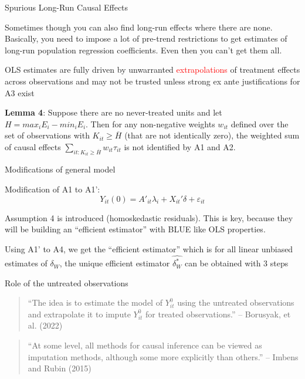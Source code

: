 \documentclass{beamer}
\begin{document}
\begin{frame}{Spurious Long-Run Causal Effects}

Sometimes though you can also find long-run effects where there are none. Basically, you need to impose a lot of pre-trend restrictions to get estimates of long-run population regression coefficients. Even then you can't get them all.  

\bigskip

OLS estimates are fully driven by unwarranted \textcolor{red}{extrapolations} of treatment effects across observations and may not be trusted unless strong ex ante justifications for A3 exist

\bigskip

\textbf{Lemma 4}: Suppose there are no never-treated units and let $H=max_i E_i - min_i E_i$. Then for any non-negative weights $w_{it}$ defined over the set of observations with $K_{it} \geq \overline{H}$ (that are not identically zero), the weighted sum of causal effects $\sum_{it:K_{it}\geq \overline{H}}w_{it} \tau_{it}$ is not identified by A1 and A2.

\end{frame}

\begin{frame}{Modifications of general model}


Modification of A1 to A1': $$ Y_{it}(0) = A'_{it} \lambda_i + X_{it}' \delta + \varepsilon_{it}$$

\bigskip

Assumption 4 is introduced (homoskedastic residuals).  This is key, because they will be building an ``efficient estimator'' with BLUE like OLS properties. 

\bigskip

Using A1' to A4, we get the ``efficient estimator'' which is for all linear unbiased estimates of $\delta_W$, the unique efficient estimator $\widehat{\delta_W^*}$ can be obtained with 3 steps

\end{frame}


\begin{frame}{Role of the untreated observations}


\begin{quote}
``The idea is to estimate the model of $Y_{it}^0$ using the untreated observations and extrapolate it to impute $Y_{it}^0$ for treated observations.'' -- Borusyak, et al. (2022)
\end{quote}

\bigskip

\begin{quote}
``At some level, all methods for causal inference can be viewed as imputation methods, although some more explicitly than others.'' -- Imbens and Rubin (2015)
\end{quote}

\end{frame}
\end{document}
